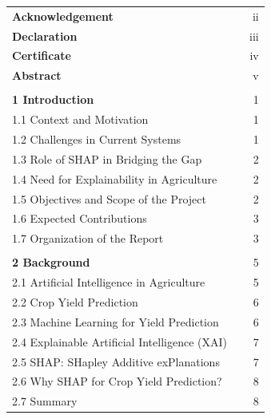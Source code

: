 \documentclass[a4paper,11pt,oneside]{book}
\begin{document}
\begin{flushleft}
\begin{tabularx}{\textwidth}{@{}lXr@{}}
\textbf{Acknowledgement} & & ii \\
\textbf{Declaration} & & iii \\
\textbf{Certificate} & & iv \\
\textbf{Abstract} & & v \\
\\
\textbf{1 Introduction} & & 1 \\
\hspace{1em}1.1 Context and Motivation & & 1 \\
\hspace{1em}1.2 Challenges in Current Systems & & 1 \\
\hspace{1em}1.3 Role of SHAP in Bridging the Gap & & 2 \\
\hspace{1em}1.4 Need for Explainability in Agriculture & & 2 \\
\hspace{1em}1.5 Objectives and Scope of the Project & & 2 \\
\hspace{1em}1.6 Expected Contributions & & 3 \\
\hspace{1em}1.7 Organization of the Report & & 3 \\
\\
\textbf{2 Background} & & 5 \\
\hspace{1em}2.1 Artificial Intelligence in Agriculture & & 5 \\
\hspace{1em}2.2 Crop Yield Prediction & & 6 \\
\hspace{1em}2.3 Machine Learning for Yield Prediction & & 6 \\
\hspace{1em}2.4 Explainable Artificial Intelligence (XAI) & & 7 \\
\hspace{1em}2.5 SHAP: SHapley Additive exPlanations & & 7 \\
\hspace{1em}2.6 Why SHAP for Crop Yield Prediction? & & 8 \\
\hspace{1em}2.7 Summary & & 8 \\
\end{tabularx}
\end{flushleft}
\end{document}
